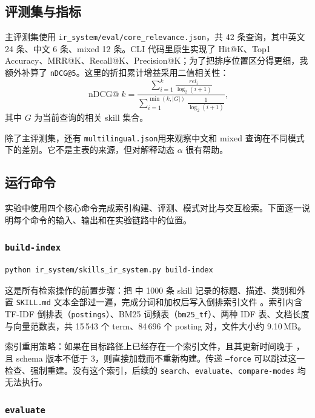\subsection{评测集与指标}
主评测集使用 \texttt{ir\_system/eval/core\_relevance.json}，共 42 条查询，其中英文 24 条、中文 6 条、mixed 12 条。CLI 代码里原生实现了 Hit@K、Top1 Accuracy、MRR@K、Recall@K、Precision@K；为了把排序位置区分得更细，我额外补算了 \texttt{nDCG@5}。这里的折扣累计增益采用二值相关性：
\begin{equation}
\label{eq:ndcg}
\operatorname{nDCG@}k=
\frac{\sum_{i=1}^{k}\frac{rel_i}{\log_2(i+1)}}{\sum_{i=1}^{\min(k,|G|)}\frac{1}{\log_2(i+1)}},
\end{equation}
其中 $G$ 为当前查询的相关 skill 集合。

除了主评测集，还有 \texttt{multilingual.json}用来观察中文和 mixed 查询在不同模式下的差别。它不是主表的来源，但对解释动态 $\alpha$ 很有帮助。

\subsection{运行命令}

实验中使用四个核心命令完成索引构建、评测、模式对比与交互检索。下面逐一说明每个命令的输入、输出和在实验链路中的位置。

\subsubsection{\texttt{build-index}}

\begin{lstlisting}[language=bash]
python ir_system/skills_ir_system.py build-index
\end{lstlisting}

这是所有检索操作的前置步骤：把  中 1000 条 skill 记录的标题、描述、类别和外置 \texttt{SKILL.md} 文本全部过一遍，完成分词和加权后写入倒排索引文件 。索引内含 TF-IDF 倒排表（\texttt{postings}）、BM25 词频表（\texttt{bm25\_tf}）、两种 IDF 表、文档长度与向量范数表，共 15\,543 个 term、84\,696 个 posting 对，文件大小约 9.10\,MB。

索引重用策略：如果在目标路径上已经存在一个索引文件，且其更新时间晚于 ，且 schema 版本不低于 3，则直接加载而不重新构建。传递 \texttt{--force} 可以跳过这一检查、强制重建。没有这个索引，后续的 \texttt{search}、\texttt{evaluate}、\texttt{compare-modes} 均无法执行。

\subsubsection{\texttt{evaluate}}

